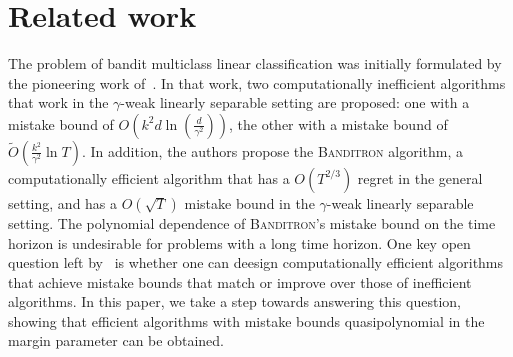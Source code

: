\section{Related work}
\label{section:related-work}

The problem of bandit multiclass linear classification was initially formulated
by the pioneering work of~\cite{Kakade-Shalev-Shwartz-Tewari-2008}. In that
work, two computationally inefficient algorithms that work in the $\gamma$-weak
linearly separable setting are proposed: one with a mistake bound of $O(k^2 d
\ln(\frac{d}{\gamma^2}))$, the other with a mistake bound of
$\widetilde{O}(\frac{k^2}{\gamma^2} \ln T)$. In addition, the authors propose
the \textsc{Banditron} algorithm, a computationally efficient algorithm that has
a $O(T^{2/3})$ regret in the general setting, and has a $O(\sqrt{T})$ mistake
bound in the $\gamma$-weak linearly separable setting. The polynomial dependence
of \textsc{Banditron}'s mistake bound on the time horizon is undesirable for
problems with a long time horizon. One key open question left
by~\cite{Kakade-Shalev-Shwartz-Tewari-2008} is whether one can deesign
computationally efficient algorithms that achieve mistake bounds that match or
improve over those of inefficient algorithms. In this paper, we take a step
towards answering this question, showing that efficient algorithms with mistake
bounds quasipolynomial in the margin parameter can be obtained.


